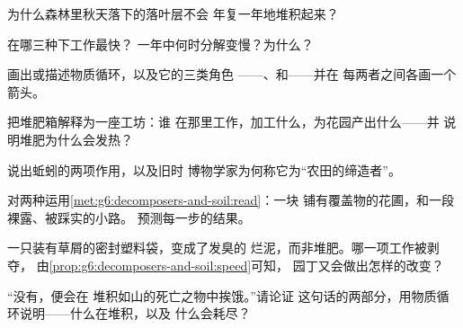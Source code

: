 \begin{exercise}[$\star$]\label{exo:g6:decomposers-and-soil:5}
为什么森林里秋天落下的落叶层不会
年复一年地堆积起来？
\end{exercise}

\begin{exercise}[$\star$]\label{exo:g6:decomposers-and-soil:6}
在哪三种下工作最快？
一年中何时分解变慢？为什么？
\end{exercise}

\begin{exercise}[$\star\star$]\label{exo:g6:decomposers-and-soil:7}
画出或描述物质循环，以及它的三类角色
——、和——并在
每两者之间各画一个箭头。
\end{exercise}

\begin{exercise}[$\star\star$]\label{exo:g6:decomposers-and-soil:8}
把堆肥箱解释为一座工坊：谁
在那里工作，加工什么，为花园产出什么——并
说明堆肥为什么会发热？
\end{exercise}

\begin{exercise}[$\star\star$]\label{exo:g6:decomposers-and-soil:9}
 说出蚯蚓的两项作用，以及旧时
博物学家为何称它为“农田的缔造者”。
\end{exercise}

\begin{exercise}[$\star\star$]\label{exo:g6:decomposers-and-soil:10}
对两种运用\cref{met:g6:decomposers-and-soil:read}：一块
铺有覆盖物的花圃，和一段裸露、被踩实的小路。
预测每一步的结果。
\end{exercise}

\begin{exercise}[$\star\star$]\label{exo:g6:decomposers-and-soil:11}
一只装有草屑的密封塑料袋，变成了发臭的
烂泥，而非堆肥。哪一项工作被剥夺，
由\cref{prop:g6:decomposers-and-soil:speed}可知，
园丁又会做出怎样的改变？
\end{exercise}

\begin{exercise}[$\star\star\star$]\label{exo:g6:decomposers-and-soil:12}
“没有，便会在
堆积如山的死亡之物中挨饿。”请论证
这句话的两部分，用物质循环说明——什么在堆积，以及
什么会耗尽？
\end{exercise}

